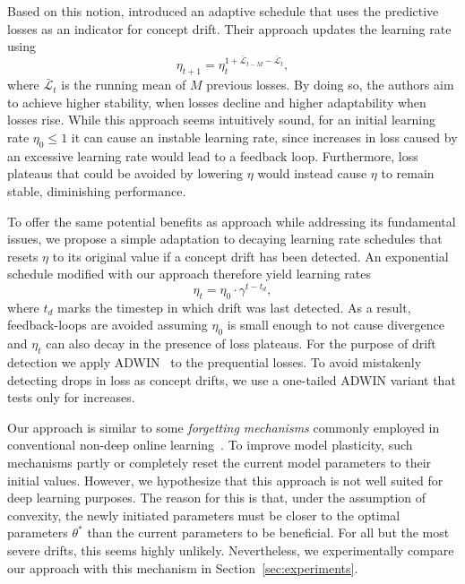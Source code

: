 \documentclass[runningheads]{llncs}
\begin{document}
Based on this notion, \textcite{kunchevaAdaptiveLearningRate2008} introduced an adaptive schedule that uses the predictive losses as an indicator for concept drift.
Their approach updates the learning rate using
\begin{equation}
	\eta_{t+1} = \eta_t^{1+	\bar{\mathcal{L}}_{t-M} - \bar{\mathcal{L}}_{t}},
\end{equation}\label{eq:kuncheva_lr}
where $\bar{\mathcal{L}}_{t}$ is the running mean of $M$ previous losses.
By doing so, the authors aim to achieve higher stability, when losses decline and higher adaptability when losses rise.
While this approach seems intuitively sound, for an initial learning rate $\eta_0 \leq 1$ it can cause an instable learning rate, since increases in loss caused by an excessive learning rate would lead to a feedback loop.
Furthermore, loss plateaus that could be avoided by lowering $\eta$ would instead cause $\eta$ to remain stable, diminishing performance.

To offer the same potential benefits as \textcite{kunchevaAdaptiveLearningRate2008} approach while addressing its fundamental issues, we propose a simple adaptation to decaying learning rate schedules that resets $\eta$ to its original value if a concept drift has been detected.
An exponential schedule modified with our approach therefore yield learning rates
\begin{equation}
	\eta_t = \eta_0 \cdot \gamma^{t-t_d},
\end{equation}\label{eq:drift_reset}
where $t_d$ marks the timestep in which drift was last detected.
As a result, feedback-loops are avoided assuming $\eta_0$ is small enough to not cause divergence and $\eta_t$ can also decay in the presence of loss plateaus.
For the purpose of drift detection we apply ADWIN~\cite{bifetLearningTimeChangingData2007} to the prequential losses.
To avoid mistakenly detecting drops in loss as concept drifts, we use a one-tailed ADWIN variant that tests only for increases.

Our approach is similar to some \textit{forgetting mechanisms} commonly employed in conventional non-deep online learning~\cite{gamaSurveyConceptDrift2014}.
To improve model plasticity, such mechanisms partly or completely reset the current model parameters to their initial values.
However, we hypothesize that this approach is not well suited for deep learning purposes.
The reason for this is that, under the assumption of convexity, the newly initiated parameters must be closer to the optimal parameters $\theta^*$ than the current parameters to be beneficial.
For all but the most severe drifts, this seems highly unlikely.
Nevertheless, we experimentally compare our approach with this mechanism in Section~\ref{sec:experiments}.
\end{document}
